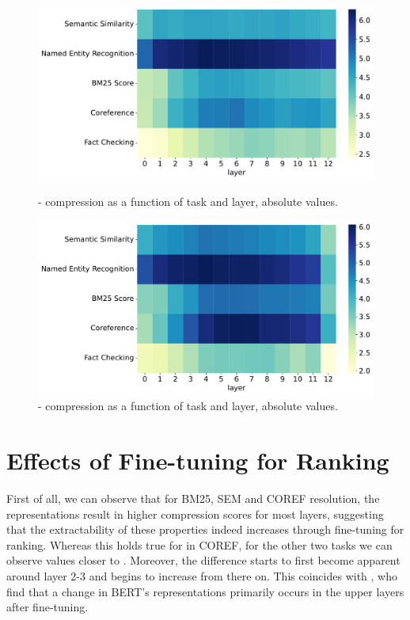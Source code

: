 \begin{figure}[!ht]
    \centering
    \includegraphics[width=\textwidth]{gfx/probing/abs_heatmap_compression_base}
    \caption{ - compression as a function of task and layer, absolute values.}
    \label{fig:abs_heatmap_comp_base}

    \centering
    \includegraphics[width=\textwidth]{gfx/probing/abs_heatmap_compression_passage}
    \caption{ - compression as a function of task and layer, absolute values.}
    \label{fig:abs_heatmap_comp_passage}
\end{figure}

\section{Effects of Fine-tuning for Ranking}
First of all, we can observe that for BM25, SEM and COREF resolution, the  representations result in higher compression scores for most layers, suggesting that the extractability of these properties indeed increases through fine-tuning for ranking. Whereas this holds true for  in COREF, for the other two tasks we can observe values closer to . Moreover, the difference starts to first become apparent around layer 2-3 and begins to increase from there on. This coincides with \citep{merchant-etal-2020-happens}, who find that a change in BERT's representations primarily occurs in the upper layers after fine-tuning.

